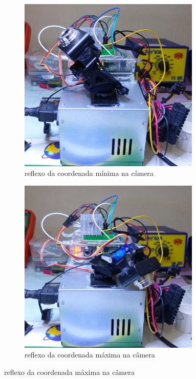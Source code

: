 \begin{figure}[H]
	\begin{subfigure}{.5\textwidth}
	\includegraphics[width=0.95\textwidth]{figuras/camera0x0.jpg}
	\caption{reflexo da coordenada mínima na câmera}
	\label{fig:camera0x0}
	\end{subfigure}%
	\begin{subfigure}{.5\textwidth}
		\includegraphics[width=0.95\textwidth]{figuras/camera100x100.jpg}
		\caption{reflexo da coordenada máxima na câmera}
		\label{fig:camera100x100}
	\end{subfigure}



\end{figure}

